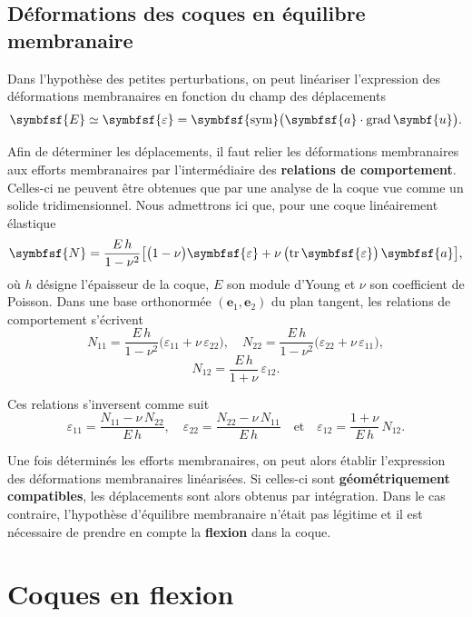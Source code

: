 \documentclass[
  a4paper,
  DIV=11,
  numbers=noendperiod]{scrreprt}
\newcommand{\grad}{\operatorname{grad}}
\newcommand{\sym}{\operatorname{\symbfsf{sym}}}
\newcommand{\tens}[1]{\symbfsf{#1}}
\newcommand{\tr}{\operatorname{tr}}
\renewcommand{\vec}[1]{\symbf{#1}}
\begin{document}
\hypertarget{duxe9formations-des-coques-en-uxe9quilibre-membranaire}{%
\section{Déformations des coques en équilibre
membranaire}\label{duxe9formations-des-coques-en-uxe9quilibre-membranaire}}

Dans l'hypothèse des petites perturbations, on peut linéariser
l'expression des déformations membranaires en fonction du champ des
déplacements \[
\tens{E} \simeq \tens{\varepsilon} = \sym \bigl( \tens{a} \cdot \grad \vec{u} \bigr).
\]

Afin de déterminer les déplacements, il faut relier les déformations
membranaires aux efforts membranaires par l'intermédiaire des
\textbf{relations de comportement}. Celles-ci ne peuvent être obtenues
que par une analyse de la coque vue comme un solide tridimensionnel.
Nous admettrons ici que, pour une coque linéairement élastique \[
\tens{N} = \frac{E \, h}{1 - \nu^2} \bigl[ \bigl( 1 - \nu \bigr) \tens{\varepsilon} + \nu \, \bigl( \tr \tens{\varepsilon} \bigr) \, \tens{a} \bigr],
\] où \(h\) désigne l'épaisseur de la coque, \(E\) son module d'Young et
\(\nu\) son coefficient de Poisson. Dans une base orthonormée
\((\vec{e}_1, \vec{e}_2)\) du plan tangent, les relations de
comportement s'écrivent \[
N_{11} = \frac{E \, h}{1 - \nu^2} \bigl( \varepsilon_{11} + \nu \, \varepsilon_{22} \bigr), \quad N_{22} = \frac{E \, h}{1 - \nu^2} \bigl( \varepsilon_{22} + \nu \, \varepsilon_{11} \bigr),
\] \[
N_{12} = \frac{E \, h}{1 + \nu} \, \varepsilon_{12}.
\]

Ces relations s'inversent comme suit \[
\varepsilon_{11} = \frac{N_{11} - \nu \, N_{22}}{E \, h}, \quad \varepsilon_{22} = \frac{N_{22} - \nu \, N_{11}}{E \, h} \quad \text{et} \quad \varepsilon_{12} = \frac{1 + \nu}{E \, h} \, N_{12}.
\]

Une fois déterminés les efforts membranaires, on peut alors établir
l'expression des déformations membranaires linéarisées. Si celles-ci
sont \textbf{géométriquement compatibles}, les déplacements sont alors
obtenus par intégration. Dans le cas contraire, l'hypothèse d'équilibre
membranaire n'était pas légitime et il est nécessaire de prendre en
compte la \textbf{flexion} dans la coque.


\hypertarget{sec-20230411093311}{%
\chapter{Coques en flexion}\label{sec-20230411093311}}
\end{document}
